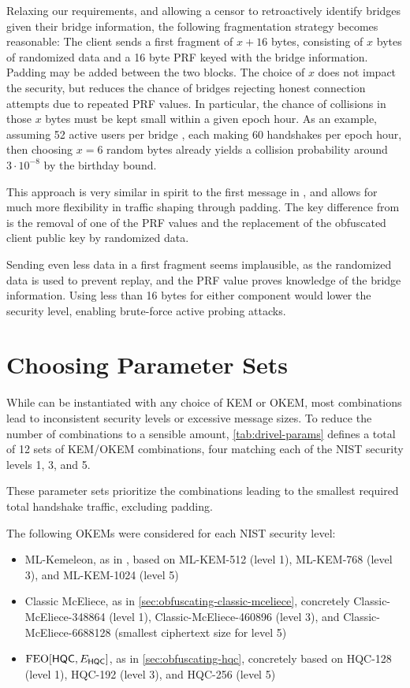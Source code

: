 Relaxing our requirements, and allowing a censor to retroactively identify bridges given their bridge information, the following fragmentation strategy becomes reasonable: The client sends a first fragment of $x+16$ bytes, consisting of $x$ bytes of randomized data and a 16 byte PRF keyed with the bridge information. Padding may be added between the two blocks. The choice of $x$ does not impact the security, but reduces the chance of bridges rejecting honest connection attempts due to repeated PRF values. In particular, the chance of collisions in those $x$ bytes must be kept small within a given epoch hour. As an example, assuming 52 active users per bridge \cite{tor-metrics}, each making 60 handshakes per epoch hour, then choosing $x=6$ random bytes already yields a collision probability around $3 \cdot 10^{-8}$ by the birthday bound.

This approach is very similar in spirit to the first message in \obfsfour{}, and allows for much more flexibility in traffic shaping through padding. The key difference from \obfsfour{} is the removal of one of the PRF values and the replacement of the obfuscated client public key by randomized data.

Sending even less data in a first fragment seems implausible, as the randomized data is used to prevent replay, and the PRF value proves knowledge of the bridge information. Using less than 16 bytes for either component would lower the security level, enabling brute-force active probing attacks.

\section{Choosing Parameter Sets} \label{sec:parameters}

While \drivel{} can be instantiated with any choice of KEM or OKEM, most combinations lead to inconsistent security levels or excessive message sizes. To reduce the number of combinations to a sensible amount, \cref{tab:drivel-params} defines a total of 12 sets of KEM/OKEM combinations, four matching each of the NIST security levels 1, 3, and 5.

These parameter sets prioritize the combinations leading to the smallest required total handshake traffic, excluding padding.

The following OKEMs were considered for each NIST security level:
\begin{itemize}
    \item ML-Kemeleon, as in \cite{irtf-cfrg-kemeleon-00}, based on ML-KEM-512 (level 1), ML-KEM-768 (level 3), and ML-KEM-1024 (level 5)
    \item Classic McEliece, as in \cref{sec:obfuscating-classic-mceliece}, concretely Classic-McEliece-348864 (level 1), Classic-McEliece-460896 (level 3), and Classic-McEliece-6688128 (smallest ciphertext size for level 5)
    \item $\textsf{\textnormal{FEO}}[\mathsf{HQC}, E_\mathsf{HQC}]$, as in \cref{sec:obfuscating-hqc}, concretely based on HQC-128 (level 1), HQC-192 (level 3), and HQC-256 (level 5)
\end{itemize}

